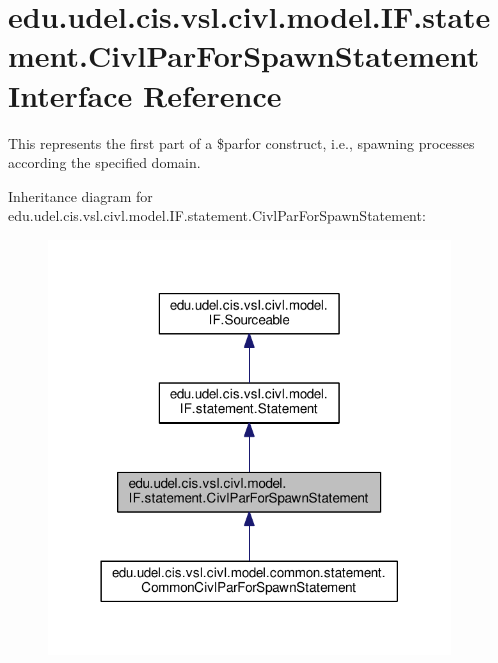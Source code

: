 \hypertarget{interfaceedu_1_1udel_1_1cis_1_1vsl_1_1civl_1_1model_1_1IF_1_1statement_1_1CivlParForSpawnStatement}{}\section{edu.\+udel.\+cis.\+vsl.\+civl.\+model.\+I\+F.\+statement.\+Civl\+Par\+For\+Spawn\+Statement Interface Reference}
\label{interfaceedu_1_1udel_1_1cis_1_1vsl_1_1civl_1_1model_1_1IF_1_1statement_1_1CivlParForSpawnStatement}


This represents the first part of a \$parfor construct, i.\+e., spawning processes according the specified domain.  




Inheritance diagram for edu.\+udel.\+cis.\+vsl.\+civl.\+model.\+I\+F.\+statement.\+Civl\+Par\+For\+Spawn\+Statement\+:
\nopagebreak
\begin{figure}[H]
\begin{center}
\leavevmode
\includegraphics[width=302pt]{interfaceedu_1_1udel_1_1cis_1_1vsl_1_1civl_1_1model_1_1IF_1_1statement_1_1CivlParForSpawnStatement__inherit__graph}
\end{center}
\end{figure}


